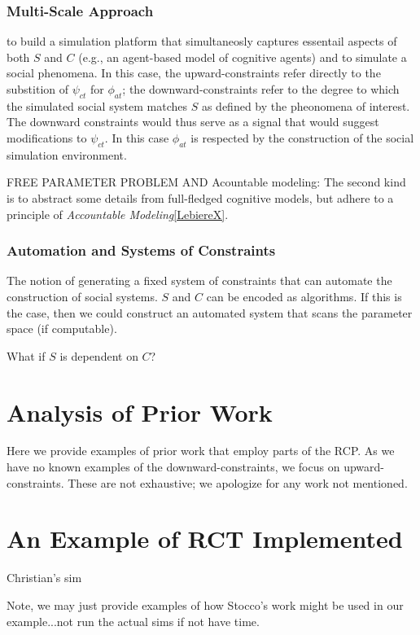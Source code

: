 \documentclass{article}
\begin{document}
\subsubsection{Multi-Scale Approach}
 
to build a simulation platform that simultaneosly captures essentail aspects of both $S$ and $C$ (e.g., an agent-based model of cognitive agents) and to simulate a social phenomena.  In this case, the upward-constraints refer directly to the substition of  $\psi_{ct}$ for $\phi_{at}$; the downward-constraints refer to the degree to which the simulated social system matches $S$ as defined by the pheonomena of interest.  The downward constraints would thus serve as a signal that would suggest modifications to $\psi_{ct}$.  In this case $\phi_{at}$ is respected by the construction of the social simulation environment.
 




FREE PARAMETER PROBLEM AND Acountable modeling:  The second kind is to abstract some details from full-fledged cognitive models, but adhere to a principle of \textit{Accountable Modeling}\ref{LebiereX}.

 


\subsubsection{Automation and Systems of Constraints}
The notion of generating a fixed system of constraints that can automate the construction of social systems.  $S$ and $C$ can be encoded as algorithms.  If this is the case, then we could construct an automated system that scans the parameter space (if computable).

What if $S$ is dependent on $C$?

\section{Analysis of Prior Work}
Here we provide examples of prior work that employ parts of the RCP.  As we have no known examples of the downward-constraints, we focus on upward-constraints.  These are not exhaustive; we apologize for any work not mentioned.  

\section{An Example of RCT Implemented}
Christian's sim

Note, we may just provide examples of how Stocco's work might be used in our example...not run the actual sims if not have time.
\end{document}
